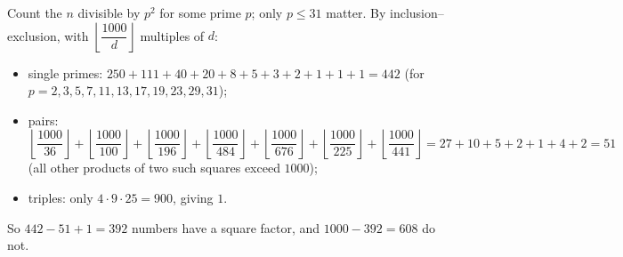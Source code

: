 Count the $n$ divisible by $p^2$ for some prime $p$; only $p\le31$ matter. By inclusion--exclusion, with $\left\lfloor\dfrac{1000}{d}\right\rfloor$ multiples of $d$:
\begin{itemize}
\item single primes: $250+111+40+20+8+5+3+2+1+1+1=442$ (for $p=2,3,5,7,11,13,17,19,23,29,31$);
\item pairs: $\left\lfloor\dfrac{1000}{36}\right\rfloor+\left\lfloor\dfrac{1000}{100}\right\rfloor+\left\lfloor\dfrac{1000}{196}\right\rfloor+\left\lfloor\dfrac{1000}{484}\right\rfloor+\left\lfloor\dfrac{1000}{676}\right\rfloor+\left\lfloor\dfrac{1000}{225}\right\rfloor+\left\lfloor\dfrac{1000}{441}\right\rfloor=27+10+5+2+1+4+2=51$ (all other products of two such squares exceed $1000$);
\item triples: only $4\cdot9\cdot25=900$, giving $1$.
\end{itemize}
So $442-51+1=392$ numbers have a square factor, and $1000-392=\boxed{608}$ do not.
